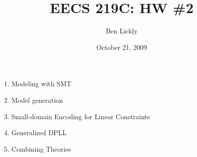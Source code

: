 \documentclass{amsart}
\title{EECS 219C: HW \#2}
\author{Ben Lickly}
\date{October 21, 2009}
\begin{document}
\begin{enumerate}
  \item Modeling with SMT
  \item Model generation
  \item Small-domain Encoding for Linear Constraints
  \item Generalized DPLL
  \item Combining Theories
\end{enumerate}

%
%
\end{document}

